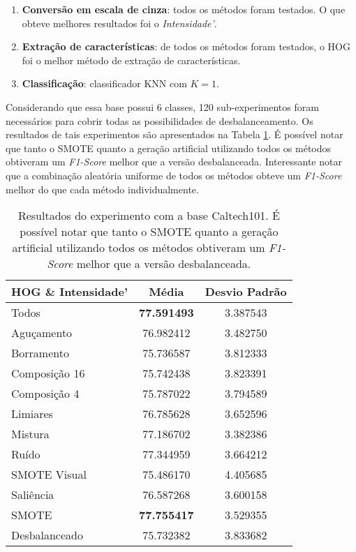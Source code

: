 \begin{enumerate}
\item \textbf{Conversão em escala de cinza}: todos os métodos foram testados. O que obteve melhores resultados foi o \textit{Intensidade'}.
\item \textbf{Extração de características}: de todos os métodos foram testados, o HOG foi o melhor método de extração de características.
\item \textbf{Classificação}: classificador KNN com $K=1$.
\end{enumerate}


Considerando que essa base possui 6 classes, 120 sub-experimentos foram necessários para cobrir todas as possibilidades de desbalanceamento. Os resultados de tais experimentos são apresentados na Tabela \ref{tab:resultados:3.2}. É possível notar que tanto o SMOTE quanto a geração artificial utilizando todos os métodos obtiveram um \textit{F1-Score} melhor que a versão desbalanceada. Interessante notar que a combinação aleatória uniforme de todos os métodos obteve um \textit{F1-Score} melhor do que cada método individualmente.

\begin{table}[H]
\begin{center}
\caption{Resultados do experimento com a base Caltech101. É possível notar que tanto o SMOTE quanto a geração artificial utilizando todos os métodos obtiveram um \textit{F1-Score} melhor que a versão desbalanceada.}
\label{tab:resultados:3.2}
\begin{tabular}{|l|c|c|}
\hline
\textbf{HOG \& Intensidade'} & \textbf{Média}     & \textbf{Desvio Padrão} \\ \hline
   Todos        &  \textbf{77.591493} &  3.387543  \\ \hline
  Aguçamento    &  76.982412 &  3.482750  \\ \hline
  Borramento    &  75.736587 &  3.812333  \\ \hline
  Composição 16 &  75.742438 &  3.823391  \\ \hline
  Composição 4  &  75.787022 &  3.794589  \\ \hline
  Limiares      &  76.785628 &  3.652596  \\ \hline
  Mistura       &  77.186702 &  3.382386  \\ \hline
  Ruído         &  77.344959 &  3.664212  \\ \hline
  SMOTE Visual  &  75.486170 &  4.405685  \\ \hline
  Saliência     &  76.587268 &  3.600158  \\ \hline
 SMOTE          &  \textbf{77.755417} &  3.529355  \\ \hline
Desbalanceado   &  75.732382 &  3.833682  \\ \hline
\end{tabular}
\end{center}
\end{table}

